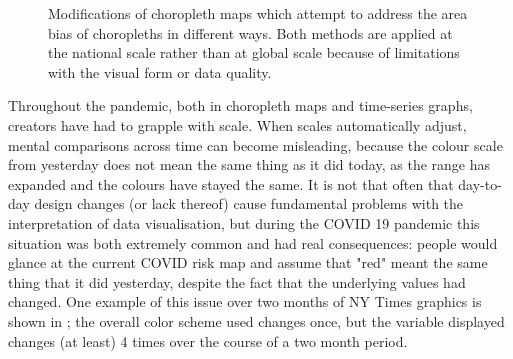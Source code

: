 \documentclass[article]{jdssv}\usepackage[]{graphicx}\usepackage[]{xcolor}
\begin{document}
\begin{figure}
\begin{subfigure}[c]{.45\textwidth}
\end{subfigure}
\caption{Modifications of choropleth maps which attempt to address the area bias of choropleths in different ways. Both methods are applied at the national scale rather than at global scale because of limitations with the visual form or data quality.}
\end{figure}




Throughout the pandemic, both in choropleth maps and time-series graphs, creators have had to grapple with scale. When scales automatically adjust, mental comparisons across time can become misleading, because the colour scale from yesterday does not mean the same thing as it did today, as the range has expanded and the colours have stayed the same. 
It is not that often that day-to-day design changes (or lack thereof) cause fundamental problems with the interpretation of data visualisation, but during the COVID 19 pandemic this situation was both extremely common and had real consequences: people would glance at the current COVID risk map and assume that "red" meant the same thing that it did yesterday, despite the fact that the underlying values had changed\citep{abiadColorDiagramWHOLebanon2020,rubelHeyUpshotNYTCurious2020,matthewsLessonFutzingData2020}. 
One example of this issue over two months of NY Times graphics is shown in ; the overall color scheme used changes once, but the variable displayed changes (at least) 4 times over the course of a two month period. 
\end{document}
